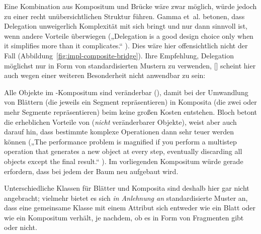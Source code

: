 \documentclass[../main/thesis.tex]{subfiles}
\begin{document}

Eine Kombination aus Kompositum und Brücke wäre zwar möglich, würde jedoch zu einer recht unübersichtlichen Struktur führen.
Gamma et~al. betonen, dass Delegation unweigerlich Komplexität mit sich bringt und nur dann sinnvoll ist, wenn andere Vorteile überwiegen („Delegation is a good design choice only when it simplifies more than it complicates.“ ).
Dies wäre hier offensichtlich nicht der Fall (Abbildung~\ref{fig:impl-composite-bridge}).
Ihre Empfehlung, Delegation möglichst nur in Form von standardisierten Mustern zu verwenden, [\cfibid] scheint hier auch wegen einer weiteren Besonderheit nicht anwendbar zu sein:

Alle Objekte im -Kompositum sind veränderbar (), damit bei der Umwandlung von Blättern (die jeweils ein Segment repräsentieren) in Komposita (die zwei oder mehr Segmente repräsentieren) beim  keine großen Kosten entstehen.
Bloch betont die erheblichen Vorteile von  (\emph{nicht} veränderbarer Objekte), weist aber auch darauf hin, dass bestimmte komplexe Operationen dann sehr teuer werden können („The performance problem is magnified if you perform a multistep operation that generates a new object at every step, eventually discarding all objects except the final result.“ ).
Im vorliegenden Kompositum würde  gerade erfordern, dass bei jedem  der Baum neu aufgebaut wird.

Unterschiedliche Klassen für Blätter und Komposita sind deshalb hier gar nicht angebracht; vielmehr bietet es sich \emph{in Anlehnung an} standardisierte Muster an, dass eine gemeinsame Klasse mit einem Attribut  sich entweder wie ein Blatt oder wie ein Kompositum verhält, je nachdem, ob es  in Form von Fragmenten gibt oder nicht.
\end{document}
